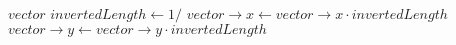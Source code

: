 \begin{algorithm}[!ht]
\caption{}
\label{alg:vectornormalized}
	\begin{algorithmic}[1]
		\Require $\mathit{vector}$
		\State $\mathit{invertedLength} \gets 1 /$ 
		\State $\mathit{vector \to x} \gets \mathit{vector \to x} \cdot \mathit{invertedLength}$
		\State $\mathit{vector \to y} \gets \mathit{vector \to y} \cdot \mathit{invertedLength}$
	\end{algorithmic}
\end{algorithm}
